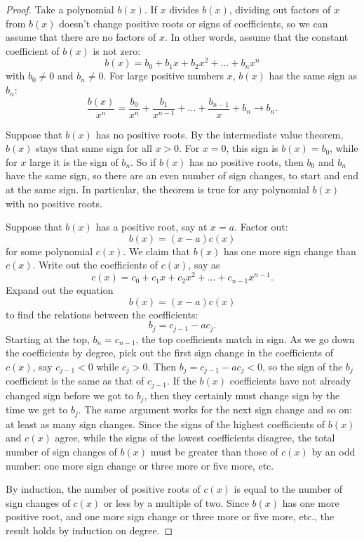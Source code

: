 \begin{proof}
Take a polynomial \(b(x)\).
If \(x\) divides \(b(x)\), dividing out factors of \(x\) from \(b(x)\) doesn't change positive roots or signs of coefficients, so we can assume that there are no factors of \(x\).
In other words, assume that the constant coefficient of \(b(x)\) is not zero:
\[
b(x)=b_0+b_1x+b_2x^2+\dots+b_n x^n
\] 
with \(b_0 \ne 0\) and \(b_n \ne 0\).
For large positive numbers \(x\), \(b(x)\) has the same sign as \(b_n\):
\[
\frac{b(x)}{x^n}
=
\frac{b_0}{x^n} + \frac{b_1}{x^{n-1}} + \dots + \frac{b_{n-1}}{x} + b_n \to b_n.
\]

Suppose that \(b(x)\) has no positive roots.
By the intermediate value theorem, \(b(x)\) stays that same sign for all \(x>0\).
For \(x=0\), this sign is \(b(x)=b_0\), while for \(x\) large it is the sign of \(b_n\).
So if \(b(x)\) has no positive roots, then \(b_0\) and \(b_n\) have the same sign, so there are an even number of sign changes, to start and end at the same sign.
In particular, the theorem is true for any polynomial \(b(x)\) with no positive roots.

Suppose that \(b(x)\) has a positive root, say at \(x=a\).
Factor out:
\[
b(x)=(x-a)c(x)
\]
for some polynomial \(c(x)\).
We claim that \(b(x)\) has one more sign change than \(c(x)\).
Write out the coefficients of \(c(x)\), say as
\[
c(x)=c_0+c_1x+c_2x^2+\dots+c_{n-1} x^{n-1}.
\]
Expand out the equation
\[
b(x)=(x-a)c(x)
\]
to find the relations between the coefficients:
\[
b_j = c_{j-1}-ac_j.
\]
Starting at the top, \(b_n=c_{n-1}\), the top coefficients match in sign.
As we go down the coefficients by degree, pick out the first sign change in the coefficients of \(c(x)\), say \(c_{j-1}<0\) while \(c_j>0\).
Then \(b_j=c_{j-1}-ac_j<0\), so the sign of the \(b_j\) coefficient is the same as that of \(c_{j-1}\).
If the \(b(x)\) coefficients have not already changed sign before we got to \(b_j\), then they certainly must change sign by the time we get to \(b_j\).
The same argument works for the next sign change and so on: at least as many sign changes.
Since the signs of the highest coefficients of \(b(x)\) and \(c(x)\) agree, while the signs of the lowest coefficients disagree, the total number of sign changes of \(b(x)\) must be greater than those of \(c(x)\) by an odd number: one more sign change or three more or five more, etc.

By induction, the number of positive roots of \(c(x)\) is equal to the number of sign changes of \(c(x)\) or less by a multiple of two.
Since \(b(x)\) has one more positive root, and one more sign change or three more or five more, etc., the result holds by induction on degree.
\end{proof}

